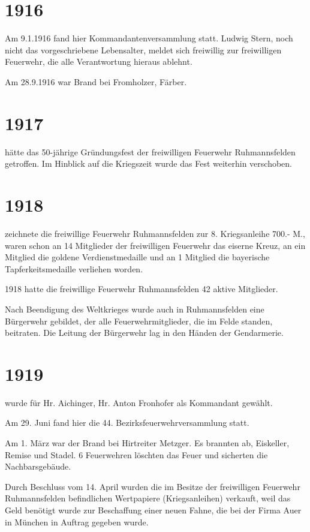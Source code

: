 \documentclass[12pt,a4paper]{book}
\begin{document}
\section*{1916}

Am 9.1.1916 fand hier Kommandantenversammlung statt. Ludwig Stern, noch nicht
das vorgeschriebene Lebensalter, meldet sich freiwillig zur freiwilligen
Feuerwehr, die alle Verantwortung hieraus ablehnt.

Am 28.9.1916 war Brand bei Fromholzer, Färber.

\section*{1917}

hätte das 50-jährige Gründungsfest der freiwilligen Feuerwehr Ruhmannsfelden
getroffen. Im Hinblick auf die Kriegszeit wurde das Fest weiterhin verschoben.

\section*{1918}

zeichnete die freiwillige Feuerwehr Ruhmannsfelden zur 8. Kriegsanleihe 700.-
M., waren schon an 14 Mitglieder der freiwilligen Feuerwehr das eiserne Kreuz,
an ein Mitglied die goldene Verdienstmedaille und an 1 Mitglied die bayerische
Tapferkeitsmedaille verliehen worden.

1918 hatte die freiwillige Feuerwehr Ruhmannsfelden 42 aktive Mitglieder.

Nach Beendigung des Weltkrieges wurde auch in Ruhmannsfelden eine Bürgerwehr
gebildet, der alle Feuerwehrmitglieder, die im Felde standen, beitraten. Die
Leitung der Bürgerwehr lag in den Händen der Gendarmerie.

\section*{1919}

wurde für Hr. Aichinger, Hr. Anton Fronhofer als Kommandant gewählt.

Am 29. Juni fand hier die 44. Bezirksfeuerwehrversammlung statt.

Am 1. März war der Brand bei Hirtreiter Metzger. Es brannten ab, Eiskeller,
Remise und Stadel. 6 Feuerwehren löschten das Feuer und sicherten die
Nachbarsgebäude.

Durch Beschluss vom 14. April wurden die im Besitze der freiwilligen Feuerwehr
Ruhmannsfelden befindlichen Wertpapiere (Kriegsanleihen) verkauft, weil das Geld
benötigt wurde zur Beschaffung einer neuen Fahne, die bei der Firma Auer in
München in Auftrag gegeben wurde.
\end{document}
